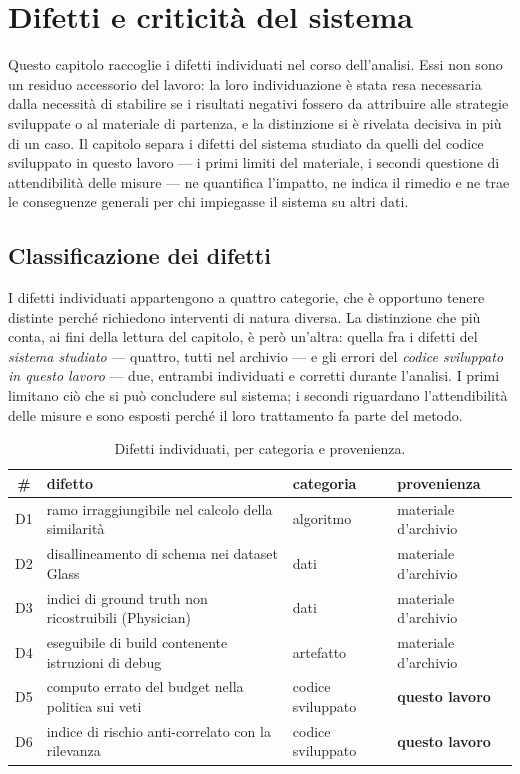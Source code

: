 \chapter{Difetti e criticità del sistema}\label{chap:defects}


\noindent Questo capitolo raccoglie i difetti individuati nel corso dell'analisi. Essi non sono
un residuo accessorio del lavoro: la loro individuazione è stata resa necessaria dalla necessità
di stabilire se i risultati negativi fossero da attribuire alle strategie sviluppate o al
materiale di partenza, e la distinzione si è rivelata decisiva in più di un caso. Il capitolo
separa i difetti del sistema studiato da quelli del codice sviluppato in questo lavoro --- i primi
limiti del materiale, i secondi questione di attendibilità delle misure --- ne quantifica
l'impatto, ne indica il rimedio e ne trae le conseguenze generali per chi impiegasse il sistema su
altri dati.

\section{Classificazione dei difetti}\label{sec:defects-taxonomy}

I difetti individuati appartengono a quattro categorie, che è opportuno tenere distinte perché
richiedono interventi di natura diversa. La distinzione che più conta, ai fini della lettura del
capitolo, è però un'altra: quella fra i difetti del \emph{sistema studiato} --- quattro, tutti nel
archivio --- e gli errori del \emph{codice sviluppato in questo lavoro} --- due,
entrambi individuati e corretti durante l'analisi. I primi limitano ciò che si può concludere sul
sistema; i secondi riguardano l'attendibilità delle misure e sono esposti perché il loro
trattamento fa parte del metodo.

\begin{table}[htbp]
\centering
\caption{Difetti individuati, per categoria e provenienza.}
\label{tab:defects}
\footnotesize
\begin{tabular}{@{}clll@{}}
\toprule
\# & difetto & categoria & provenienza \\
\midrule
D1 & ramo irraggiungibile nel calcolo della similarità & algoritmo & materiale d'archivio \\
D2 & disallineamento di schema nei dataset Glass & dati & materiale d'archivio \\
D3 & indici di ground truth non ricostruibili (Physician) & dati & materiale d'archivio \\
D4 & eseguibile di build contenente istruzioni di debug & artefatto & materiale d'archivio \\
D5 & computo errato del budget nella politica sui veti & codice sviluppato & \textbf{questo lavoro} \\
D6 & indice di rischio anti-correlato con la rilevanza & codice sviluppato & \textbf{questo lavoro} \\
\bottomrule
\end{tabular}
\end{table}


